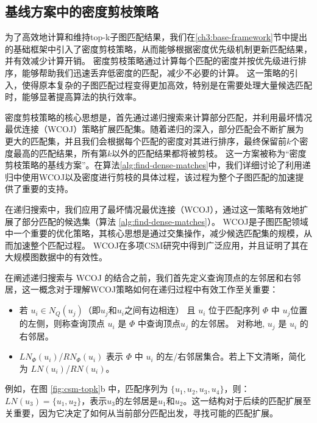\subsection{基线方案中的密度剪枝策略}
\label{ch3:wegiht-prune-baseline}
为了高效地计算和维持top-k子图匹配结果，我们在\ref{ch3:base-framework}节中提出的基础框架中引入了密度剪枝策略，从而能够根据密度优先级机制更新匹配结果，并有效减少计算开销。
密度剪枝策略通过计算每个匹配的密度并按优先级进行排序，能够帮助我们迅速丢弃低密度的匹配，减少不必要的计算。
这一策略的引入，使得原本复杂的子图匹配过程变得更加高效，特别是在需要处理大量候选匹配时，能够显著提高算法的执行效率。

密度剪枝策略的核心思想是，首先通过递归搜索来计算部分匹配，并利用最坏情况最优连接（WCOJ）\cite{sm-bfs-DBLP:conf/focs/AtseriasGM08}策略扩展匹配集。随着递归的深入，部分匹配会不断扩展为更大的匹配集，并且我们会根据每个匹配的密度对其进行排序，最终保留前$k$个密度最高的匹配结果，所有第$k$以外的匹配结果都将被剪枝。
这一方案被称为“密度剪枝策略的基线方案”。在算法\ref{alg:find-dense-matches}中，我们详细讨论了利用递归中使用WCOJ以及密度进行剪枝的具体过程，该过程为整个子图匹配的加速提供了重要的支持。

在递归搜索中，我们应用了最坏情况最优连接（WCOJ）\cite{wcoj-generic-join-DBLP:journals/sigmod/NgoRR13}，通过这一策略有效地扩展了部分匹配的候选集（算法 \ref{alg:find-dense-matches}）。
WCOJ是子图匹配领域中一个重要的优化策略，其核心思想是通过交集操作，减少候选匹配集的规模，从而加速整个匹配过程。
WCOJ在多项CSM研究中得到广泛应用\cite{csm-graphflow-DBLP:conf/sigmod/KankanamgeSMCS17,csm-graphflowpp-DBLP:journals/tods/MhedhbiKS21,csm-survey:DBLP:journals/pvldb/SunSLH22}，并且证明了其在大规模图数据中的有效性。

在阐述递归搜索与 WCOJ 的结合之前，我们首先定义查询顶点的左邻居和右邻居，这一概念对于理解WCOJ策略如何在递归过程中有效工作至关重要：
\begin{itemize}
    \item 若 $u_i \in N_Q(u_j)$（即$u_j$和$u_i$之间有边相连） 且 $u_i$ 位于匹配序列 $\Phi$ 中 $u_j$位置的左侧，则称查询顶点 $u_i$ 是 $\Phi$ 中查询顶点$u_j$ 的左邻居。
    对称地, $u_j$ 是 $u_i$ 的右邻居。
    \item $LN_{\Phi}(u_i)$/$RN_{\Phi}(u_i)$ 表示 $\Phi$ 中 $u_i$ 的左/右邻居集合。若上下文清晰，简化为 $LN(u_i)$/$RN(u_i)$。
\end{itemize}   

例如，在图 \ref{fig:csm-topk}b 中，匹配序列为 $\{u_1, u_2, u_3, u_4\}$，则：$LN(u_3) = \{u_1, u_2\}$，表示$u_3$的左邻居是$u_1$和$u_2$。这一结构对于后续的匹配扩展至关重要，因为它决定了如何从当前部分匹配出发，寻找可能的匹配扩展。

